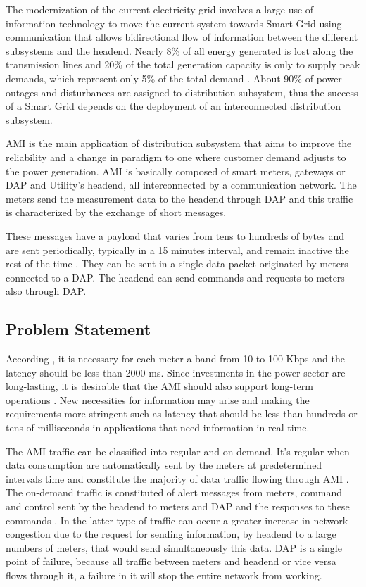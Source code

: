 \documentclass[conference]{IEEEtran}
\begin{document}
The modernization of the current electricity grid involves a large use of information technology to move the current system towards Smart Grid using communication that allows bidirectional flow of information between the different subsystems and the headend. Nearly 8\% of all energy generated is lost along the transmission lines and 20\% of the total generation capacity is only to supply peak demands, which represent only 5\% of the total demand \cite{Farhangi2010}. About 90\% of power outages and disturbances are assigned to distribution subsystem, thus the success of a Smart Grid depends on the deployment of an interconnected distribution subsystem. 

AMI is the main application of distribution subsystem that aims to improve the reliability and  a change in paradigm  to one where customer demand adjusts to the power generation. AMI is basically composed of smart meters, gateways or DAP and  Utility's headend, all interconnected by a communication network. The meters send the measurement data to the headend through DAP and this traffic is characterized by the exchange of short messages.  

These messages have a payload that varies from tens to hundreds of bytes and are sent periodically, typically in a 15 minutes interval, and remain inactive the rest of the time \cite{SRS:13,4547164}. They can be sent in a single data packet originated by meters connected to a DAP. The headend can send commands and requests to meters also through DAP.


\subsection{Problem Statement}

According \cite{Gungor2013}, it is necessary for each meter a band from 10 to 100 Kbps and the latency should be less than 2000 ms. Since investments in the power sector are long-lasting, it is desirable that the AMI should also support long-term operations \cite{5484223}. New necessities for information may arise and making the requirements more stringent such as latency that should be less than hundreds or tens of milliseconds in applications that need information in real time.

The AMI traffic can be classified into regular and on-demand. It's regular when data consumption are automatically sent by the meters at predetermined intervals time \cite{Plan2011,4547164} and constitute the majority of data traffic flowing through AMI \cite{5484223}. The on-demand traffic is constituted of alert messages from meters, command and control sent by the headend  to meters and DAP and the responses to these commands \cite{Plan2011}. In the latter type of traffic can occur a greater increase in network congestion due to the request for sending information,  by  headend to a large numbers of meters, that would send simultaneously this data. DAP is a single point of failure, because all traffic between meters and headend or vice versa flows through it, a failure in it will stop the entire network from working.
\end{document}

